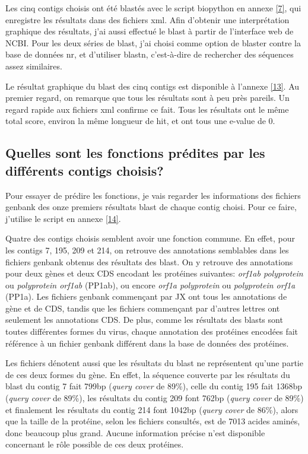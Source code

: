 \documentclass[10.9pt]{article} %
\begin{document}
Les cinq contigs choisis ont été blastés avec le script biopython en annexe \ref{7}, qui enregistre 
les résultats dans des fichiers xml. Afin d'obtenir une interprétation graphique des résultats, 
j'ai aussi effectué le blast à partir de l'interface web de NCBI. Pour les deux séries de 
blast, j'ai choisi comme option de blaster contre la base de données nr, et d'utiliser blastn, 
c'est-à-dire de rechercher des séquences assez similaires.

Le résultat graphique du blast des cinq contigs est disponible à l'annexe \ref{13}. 
Au premier regard, on remarque que tous les résultats sont à peu près pareils. Un regard rapide 
aux fichiers xml confirme ce fait. Tous les résultats ont le même total score, environ la même
longueur de hit, et ont tous une e-value de 0.

\subsection[Fonctions prédites des contigs]{Quelles sont les fonctions prédites par les différents contigs choisis?}

Pour essayer de prédire les fonctions, je vais regarder les informations des fichiers
genbank des onze premiers résultats blast de chaque contig choisi. Pour ce faire, 
j'utilise le script en annexe \ref{14}.

Quatre des contigs choisis semblent avoir une fonction commune. En effet, pour les contigs 7, 
195, 209 et 214, on retrouve des annotations semblables dans les fichiers genbank obtenus des
résultats des blast. On y retrouve des annotations pour deux
gènes et deux CDS encodant les protéines suivantes: \emph{orf1ab polyprotein} ou 
\emph{polyprotein orf1ab} (PP1ab), ou encore \emph{orf1a polyprotein} ou 
\emph{polyprotein orf1a} (PP1a). Les fichiers genbank commençant par JX ont tous les annotations
de gène et de CDS, tandis que les fichiers commençant par d'autres lettres ont seulement les
annotations CDS. De plus, comme les résultats des blasts sont toutes différentes formes du virus, 
chaque annotation des protéines encodées fait référence à un fichier genbank différent dans la 
base de données des protéines.

Les fichiers dénotent aussi que les résultats du blast ne représentent qu'une partie de ces 
deux formes du gène. En effet, la séquence couverte par les résultats du blast du contig 7 
fait 799bp (\emph{query cover} de 89\%), celle du contig 195 fait
1368bp (\emph{query cover} de 89\%), les résultats du contig 209 font 762bp (\emph{query cover}
de 89\%) et finalement les résultats du contig 214 font 1042bp (\emph{query cover} de 86\%), 
alors que la taille de la protéine, selon les fichiers consultés, est de 7013 acides aminés, 
donc beaucoup plus grand. Aucune information précise n'est disponible concernant le rôle possible
de ces deux protéines.
\end{document}
